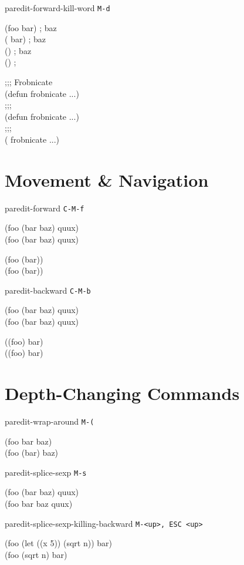 \documentclass[landscape,a3paper]{article}
\begin{document}
\begin{multicols}{4}
paredit-forward-kill-word \texttt{M-d}

\ttfamily
\cursor(foo bar) \space \space \space ; baz\\
(\cursor{} bar) \space \space \space ; baz\\
(\cursor) \space \space \space ; baz\\
() \space \space \space ;\cursor

;;;\cursor{} Frobnicate\\
(defun frobnicate ...)\\
;;;\cursor\\
(defun frobnicate ...)\\
;;;\\
(\cursor{} frobnicate ...)
\rmfamily

    \section*{Movement \& Navigation}

paredit-forward \texttt{C-M-f}

\ttfamily
(foo \cursor(bar baz) quux)\\
(foo (bar baz)\cursor{} quux)

(foo (bar)\cursor)\\
(foo (bar))\cursor
\rmfamily

paredit-backward \texttt{C-M-b}

\ttfamily
(foo (bar baz)\cursor{} quux)\\
(foo \cursor(bar baz) quux)

(\cursor(foo) bar)\\
\cursor((foo) bar)
\rmfamily

    \section*{Depth-Changing Commands}

paredit-wrap-around \texttt{M-(}

\ttfamily
(foo \cursor bar baz)\\
(foo (\cursor bar) baz)
\rmfamily

paredit-splice-sexp \texttt{M-s}

\ttfamily
(foo (bar\cursor{} baz) quux)\\
(foo bar\cursor{} baz quux)
\rmfamily

paredit-splice-sexp-killing-backward \texttt{M-<up>, ESC <up>}

\ttfamily
(foo (let ((x 5)) \cursor(sqrt n)) bar)\\
(foo \cursor(sqrt n) bar)
\rmfamily


\end{multicols}
\end{document}
